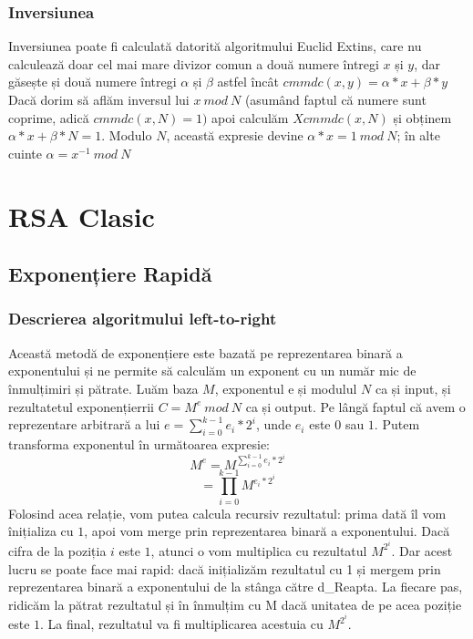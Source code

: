 \documentclass[12]{report}
\begin{document}
       \subsubsection{Inversiunea}
         Inversiunea poate fi calculată datorită algoritmului Euclid Extins, care nu calculează doar cel mai mare divizor comun a două numere întregi $x$ și $y$, dar găsește și două numere întregi $ \alpha $ și $  \beta $ astfel încât $ cmmdc(x,y) = \alpha * x + \beta * y$ \\
        Dacă dorim să aflăm inversul lui  $x \ mod \ N$ (asumând faptul că numere sunt coprime, adică $cmmdc(x,N)=1)$ apoi calculăm $Xcmmdc(x,N)$ și obținem $ \alpha * x + \beta * N = 1$. Modulo $N$, această expresie devine $\alpha * x  = 1 \ mod \ N$; în alte cuinte $\alpha= x^{-1} \ mod \ N$
        
       
    \section{RSA Clasic}
     \subsection{Exponențiere Rapidă}
      \subsubsection{Descrierea algoritmului left-to-right}
       Această metodă de exponențiere este bazată pe reprezentarea binară a exponentului și ne permite să calculăm un exponent cu un număr mic de înmulțimiri și pătrate. Luăm baza $M$, exponentul e și modulul $N$ ca și input, și rezultatetul exponențierrii $C = M^e \ mod \ N$ ca și output. Pe lângă faptul că avem o reprezentare arbitrară a lui $ e = \sum_{i=0} ^ {k-1} e_i * 2^i $, unde $ e_i $ este $0$ sau $1$. Putem transforma exponentul în următoarea expresie: \\
       $$ M^e = M^{\sum_{i=0} ^ {k-1} e_i * 2^i} $$ 
       $$ =  \prod_{i=0}^{k-1} M^{e_i*2^i} $$ 
       Folosind acea relație, vom putea calcula recursiv rezultatul: prima dată îl vom înițializa cu $1$, apoi vom merge prin reprezentarea binară a exponentului. Dacă cifra de la poziția $i$ este $1$, atunci o vom multiplica cu rezultatul $ M^{2^i}$. Dar acest lucru se poate face mai rapid: dacă inițializăm rezultatul cu 1 și mergem prin reprezentarea binară a exponentului de la stânga către d_Reapta. La fiecare pas, ridicăm la pătrat rezultatul și în înmulțim cu M dacă unitatea de pe acea poziție este $1$. La final, rezultatul va fi multiplicarea acestuia cu $ M^{2^i}$.
\end{document}
